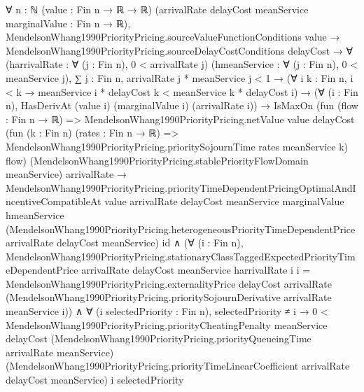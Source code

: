 \documentclass[10pt]{article}
\begin{document}
\begin{ReviewVerbatim}
∀ {n : ℕ} (value : Fin n → ℝ → ℝ) (arrivalRate delayCost meanService marginalValue : Fin n → ℝ),
  MendelsonWhang1990PriorityPricing.sourceValueFunctionConditions value →
    MendelsonWhang1990PriorityPricing.sourceDelayCostConditions delayCost →
      ∀ (harrivalRate : ∀ (j : Fin n), 0 < arrivalRate j) (hmeanService : ∀ (j : Fin n), 0 < meanService j),
        ∑ j : Fin n, arrivalRate j * meanService j < 1 →
          (∀ {i k : Fin n}, i < k → meanService i * delayCost k < meanService k * delayCost i) →
            (∀ (i : Fin n), HasDerivAt (value i) (marginalValue i) (arrivalRate i)) →
              IsMaxOn
                  (fun (flow : Fin n → ℝ) =>
                    MendelsonWhang1990PriorityPricing.netValue value delayCost
                      (fun (k : Fin n) (rates : Fin n → ℝ) =>
                        MendelsonWhang1990PriorityPricing.prioritySojournTime rates meanService k)
                      flow)
                  (MendelsonWhang1990PriorityPricing.stablePriorityFlowDomain meanService) arrivalRate →
                MendelsonWhang1990PriorityPricing.priorityTimeDependentPricingOptimalAndIncentiveCompatibleAt value
                    arrivalRate delayCost meanService marginalValue hmeanService
                    (MendelsonWhang1990PriorityPricing.heterogeneousPriorityTimeDependentPrice arrivalRate delayCost
                      meanService)
                    id ∧
                  (∀ (i : Fin n),
                      MendelsonWhang1990PriorityPricing.stationaryClassTaggedExpectedPriorityTimeDependentPrice
                          arrivalRate delayCost meanService harrivalRate i i =
                        MendelsonWhang1990PriorityPricing.externalityPrice delayCost arrivalRate
                          (MendelsonWhang1990PriorityPricing.prioritySojournDerivative arrivalRate meanService i)) ∧
                    ∀ (i selectedPriority : Fin n),
                      selectedPriority ≠ i →
                        0 <
                          MendelsonWhang1990PriorityPricing.priorityCheatingPenalty meanService delayCost
                            (MendelsonWhang1990PriorityPricing.priorityQueueingTime arrivalRate meanService)
                            (MendelsonWhang1990PriorityPricing.priorityTimeLinearCoefficient arrivalRate delayCost
                              meanService)
                            i selectedPriority
\end{ReviewVerbatim}
\end{document}

